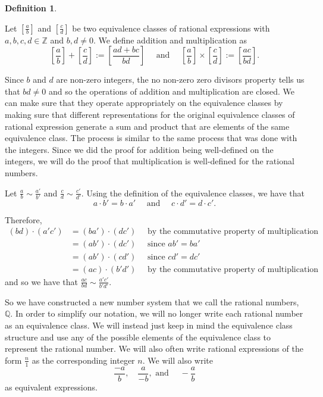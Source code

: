 \documentclass[
]{book}
\theoremstyle{definition}
\newtheorem{definition}{Definition}[chapter]
\theoremstyle{definition}
\theoremstyle{definition}
\theoremstyle{definition}
\theoremstyle{remark}
\begin{document}
\begin{definition}
\protect\hypertarget{def:unlabeled-div-42}{}\label{def:unlabeled-div-42}

Let \(\left[\frac{a}{b}\right]\) and \(\left[\frac{c}{d}\right]\) be two equivalence classes of rational expressions with \(a,b,c,d\in \mathbb{Z}\) and \(b,d\neq 0\). We define addition and multiplication as
\[\left[\frac{a}{b}\right] + \left[\frac{c}{d}\right] := \left[\frac{ad+bc}{bd}\right] \quad \mbox{ and } \quad \left[\frac{a}{b}\right] \times \left[\frac{c}{d}\right] := \left[ \frac{ac}{bd} \right].\]

\end{definition}

Since \(b\) and \(d\) are non-zero integers, the no non-zero zero divisors property tells us that \(bd\neq 0\) and so the operations of addition and multiplication are closed. We can make sure that they operate appropriately on the equivalence classes by making sure that different representations for the original equivalence classes of rational expression generate a sum and product that are elements of the same equivalence class. The process is similar to the same process that was done with the integers. Since we did the proof for addition being well-defined on the integers, we will do the proof that multiplication is well-defined for the rational numbers.

Let \(\frac{a}{b}\sim \frac{a'}{b'}\) and \(\frac{c}{d} \sim \frac{c'}{d'}\). Using the definition of the equivalence classes, we have that \[a\cdot b' = b \cdot a' \quad \mbox{ and } \quad c \cdot d' = d \cdot c'.\]

Therefore,
\begin{align*}
    (bd)\cdot (a'c') &= (ba') \cdot (dc') \quad \mbox{ by the commutative property of multiplication} \\
    &= (ab') \cdot (dc') \quad \mbox{ since } ab' = ba' \\
    &= (ab') \cdot (cd') \quad \mbox{ since } cd'=dc' \\
    &= (ac) \cdot (b'd') \quad \mbox{ by the commutative property of multiplication}
\end{align*}
and so we have that \(\frac{ac}{bd} \sim \frac{a'c'}{b'd'}\).

So we have constructed a new number system that we call the rational numbers, \(\mathbb{Q}\). In order to simplify our notation, we will no longer write each rational number as an equivalence class. We will instead just keep in mind the equivalence class structure and use any of the possible elements of the equivalence class to represent the rational number. We will also often write rational expressions of the form \(\frac{n}{1}\) as the corresponding integer \(n\). We will also write
\[\frac{-a}{b}, \quad \frac{a}{-b}, \mbox{ and }\quad -\frac{a}{b} \] as equivalent expressions.
\end{document}

